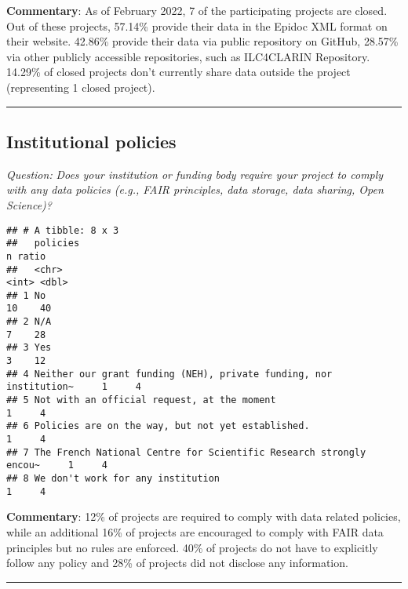 \documentclass[
]{article}
\begin{document}
\textbf{Commentary}: As of February 2022, 7 of the participating
projects are closed. Out of these projects, 57.14\% provide their data
in the Epidoc XML format on their website. 42.86\% provide their data
via public repository on GitHub, 28.57\% via other publicly accessible
repositories, such as ILC4CLARIN Repository. 14.29\% of closed projects
don't currently share data outside the project (representing 1 closed
project).

\begin{center}\rule{0.5\linewidth}{0.5pt}\end{center}

\hypertarget{institutional-policies-1}{%
\subsection{Institutional policies}\label{institutional-policies-1}}

\emph{Question:} \emph{Does your institution or funding body require
your project to comply with any data policies (e.g., FAIR principles,
data storage, data sharing, Open Science)?}

\begin{verbatim}
## # A tibble: 8 x 3
##   policies                                                               n ratio
##   <chr>                                                              <int> <dbl>
## 1 No                                                                    10    40
## 2 N/A                                                                    7    28
## 3 Yes                                                                    3    12
## 4 Neither our grant funding (NEH), private funding, nor institution~     1     4
## 5 Not with an official request, at the moment                            1     4
## 6 Policies are on the way, but not yet established.                      1     4
## 7 The French National Centre for Scientific Research strongly encou~     1     4
## 8 We don't work for any institution                                      1     4
\end{verbatim}

\textbf{Commentary}: 12\% of projects are required to comply with data
related policies, while an additional 16\% of projects are encouraged to
comply with FAIR data principles but no rules are enforced. 40\% of
projects do not have to explicitly follow any policy and 28\% of
projects did not disclose any information.

\begin{center}\rule{0.5\linewidth}{0.5pt}\end{center}
\end{document}
